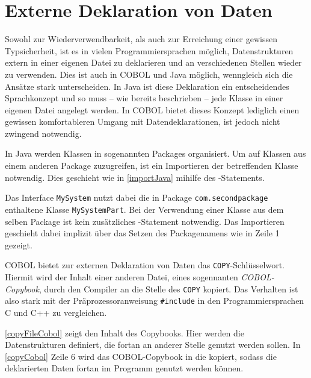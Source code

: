 \section{Externe Deklaration von Daten} 
  
Sowohl zur Wiederverwendbarkeit, als auch zur Erreichung einer gewissen Typsicherheit, ist es in vielen Programmiersprachen möglich, Datenstrukturen extern in einer eigenen Datei zu deklarieren und an verschiedenen Stellen wieder zu verwenden. Dies ist auch in COBOL und Java möglich, wenngleich sich die Ansätze stark unterscheiden. In Java ist diese Deklaration ein entscheidendes Sprachkonzept und so muss -- wie bereits beschrieben -- jede Klasse in einer eigenen Datei angelegt werden. In COBOL bietet dieses Konzept lediglich einen gewissen komfortableren Umgang mit Datendeklarationen, ist jedoch nicht zwingend notwendig.

In Java werden Klassen in sogenannten Packages organisiert. Um auf Klassen aus einem anderen Package zuzugreifen, ist ein Importieren der betreffenden Klasse notwendig. Dies geschieht wie in \autoref{importJava} mihilfe des -Statements.

Das Interface \texttt{MySystem} nutzt dabei die in Package \texttt{com.secondpackage} enthaltene Klasse \texttt{MySystemPart}. Bei der Verwendung einer Klasse aus dem selben Package ist kein zusätzliches -Statement notwendig. Das Importieren geschieht dabei implizit über das Setzen des Packagenamens wie in Zeile 1 gezeigt.

COBOL bietet zur externen Deklaration von Daten das \texttt{COPY}-Schlüsselwort. Hiermit wird der Inhalt einer anderen Datei, eines sogennanten \textit{COBOL-Copybook}, durch den Compiler an die Stelle des \texttt{COPY} kopiert. Das Verhalten ist also stark mit der Präprozessoranweisung \texttt{#include} in den Programmiersprachen C und C++ zu vergleichen.

\autoref{copyFileCobol} zeigt den Inhalt des Copybooks. Hier werden die Datenstrukturen definiert, die fortan an anderer Stelle genutzt werden sollen. In \autoref{copyCobol} Zeile 6 wird das COBOL-Copybook in die  kopiert, sodass die deklarierten Daten fortan im Programm genutzt werden können.

